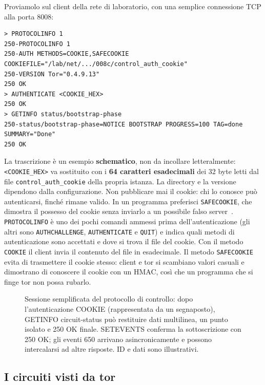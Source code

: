 Proviamolo sul client della rete di laboratorio, con una semplice connessione TCP alla porta 8008:
\begin{lstlisting}[numbers=none]
> PROTOCOLINFO 1
250-PROTOCOLINFO 1
250-AUTH METHODS=COOKIE,SAFECOOKIE COOKIEFILE="/lab/net/.../008c/control_auth_cookie"
250-VERSION Tor="0.4.9.13"
250 OK
> AUTHENTICATE <COOKIE_HEX>
250 OK
> GETINFO status/bootstrap-phase
250-status/bootstrap-phase=NOTICE BOOTSTRAP PROGRESS=100 TAG=done SUMMARY="Done"
250 OK
\end{lstlisting}
La trascrizione è un esempio \textbf{schematico}, non da incollare letteralmente: \texttt{<COOKIE\_HEX>} va sostituito con i \textbf{64 caratteri esadecimali} dei 32 byte letti dal file \texttt{control\_auth\_cookie} della propria istanza. La directory e la versione dipendono dalla configurazione. Non pubblicare mai il cookie: chi lo conosce può autenticarsi, finché rimane valido. In un programma preferisci \texttt{SAFECOOKIE}, che dimostra il possesso del cookie senza inviarlo a un possibile falso server~.
\texttt{PROTOCOLINFO} è uno dei pochi comandi ammessi prima dell'autenticazione (gli altri sono \texttt{AUTHCHALLENGE}, \texttt{AUTHENTICATE} e \texttt{QUIT}) e indica quali metodi di autenticazione sono accettati e dove si trova il file del cookie. Con il metodo \texttt{COOKIE} il client invia il contenuto del file in esadecimale. Il metodo \texttt{SAFECOOKIE} evita di trasmettere il cookie stesso: client e tor si scambiano valori casuali e dimostrano di conoscere il cookie con un HMAC, così che un programma che si finge tor non possa rubarlo.

\begin{figure}[htbp]
\centering

\caption{Sessione semplificata del protocollo di controllo: dopo l'autenticazione COOKIE (rappresentata da un segnaposto), GETINFO circuit-status può restituire dati multilinea, un punto isolato e 250 OK finale. SETEVENTS conferma la sottoscrizione con 250 OK; gli eventi 650 arrivano asincronicamente e possono intercalarsi ad altre risposte. ID e dati sono illustrativi.}
\label{fig:controllo}
\end{figure}

\subsection{I circuiti visti da tor}

